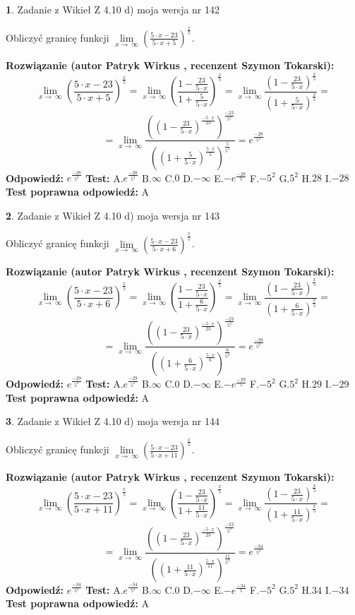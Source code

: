 \documentclass[12pt, a4paper]{article}
\theoremstyle{definition} %
\newtheorem{zad}{}
\newcommand{\zadStart}[1]{\begin{zad}#1\newline}
\newcommand{\zadStop}{\end{zad}}
\newcommand{\rozwStart}[2]{\noindent \textbf{Rozwiązanie (autor #1 , recenzent #2): }\newline}
\newcommand{\rozwStop}{\newline}
\newcommand{\odpStart}{\noindent \textbf{Odpowiedź:}\newline}
\newcommand{\odpStop}{\newline}
\newcommand{\testStart}{\noindent \textbf{Test:}\newline}
\newcommand{\testStop}{\newline}
\newcommand{\kluczStart}{\noindent \textbf{Test poprawna odpowiedź:}\newline}
\newcommand{\kluczStop}{\newline}
\begin{document}
\zadStart{Zadanie z Wikieł Z 4.10 d) moja wersja nr 142}


Obliczyć granicę funkcji  $\lim\limits_{x\to\ \infty}(\frac{5\cdot x-23}{5\cdot x+5})^{\frac{x}{5}}$.
\zadStop
\rozwStart{Patryk Wirkus}{Szymon Tokarski}
$$\lim\limits_{x\to\ \infty}(\frac{5\cdot x-23}{5\cdot x+5})^{\frac{x}{5}} = \lim\limits_{x\to\ \infty}(\frac{1-\frac{23}{5\cdot x}}{1+\frac{5}{5\cdot x}})^{\frac{x}{5}}=\lim\limits_{x\to\ \infty}\frac{(1-\frac{23}{5\cdot x})^{\frac{x}{5}}}{(1+\frac{5}{5\cdot x})^{\frac{x}{5}}}=$$
$$=\lim\limits_{x\to\ \infty}\frac{((1-\frac{23}{5\cdot x})^{\frac{-5\cdot x}{23}})^{\frac{-23}{5^{2}}}}{((1+\frac{5}{5\cdot x})^{\frac{5\cdot x}{5}})^{\frac{5}{5^{2}}}}=e^{\frac{-28}{5^{2}}}$$
\rozwStop
\odpStart
$e^{\frac{-28}{5^{2}}}$
\odpStop
\testStart
A.$e^{\frac{-28}{5^{2}}}$ B.$\infty$ C.$0$ D.$-\infty$ E.$-e^{\frac{-28}{5}}$
F.$-5^{2}$ G.$5^{2}$
H.$28$
I.$-28$
\testStop
\kluczStart
A
\kluczStop



\zadStart{Zadanie z Wikieł Z 4.10 d) moja wersja nr 143}


Obliczyć granicę funkcji  $\lim\limits_{x\to\ \infty}(\frac{5\cdot x-23}{5\cdot x+6})^{\frac{x}{5}}$.
\zadStop
\rozwStart{Patryk Wirkus}{Szymon Tokarski}
$$\lim\limits_{x\to\ \infty}(\frac{5\cdot x-23}{5\cdot x+6})^{\frac{x}{5}} = \lim\limits_{x\to\ \infty}(\frac{1-\frac{23}{5\cdot x}}{1+\frac{6}{5\cdot x}})^{\frac{x}{5}}=\lim\limits_{x\to\ \infty}\frac{(1-\frac{23}{5\cdot x})^{\frac{x}{5}}}{(1+\frac{6}{5\cdot x})^{\frac{x}{5}}}=$$
$$=\lim\limits_{x\to\ \infty}\frac{((1-\frac{23}{5\cdot x})^{\frac{-5\cdot x}{23}})^{\frac{-23}{5^{2}}}}{((1+\frac{6}{5\cdot x})^{\frac{5\cdot x}{6}})^{\frac{6}{5^{2}}}}=e^{\frac{-29}{5^{2}}}$$
\rozwStop
\odpStart
$e^{\frac{-29}{5^{2}}}$
\odpStop
\testStart
A.$e^{\frac{-29}{5^{2}}}$ B.$\infty$ C.$0$ D.$-\infty$ E.$-e^{\frac{-29}{5}}$
F.$-5^{2}$ G.$5^{2}$
H.$29$
I.$-29$
\testStop
\kluczStart
A
\kluczStop



\zadStart{Zadanie z Wikieł Z 4.10 d) moja wersja nr 144}


Obliczyć granicę funkcji  $\lim\limits_{x\to\ \infty}(\frac{5\cdot x-23}{5\cdot x+11})^{\frac{x}{5}}$.
\zadStop
\rozwStart{Patryk Wirkus}{Szymon Tokarski}
$$\lim\limits_{x\to\ \infty}(\frac{5\cdot x-23}{5\cdot x+11})^{\frac{x}{5}} = \lim\limits_{x\to\ \infty}(\frac{1-\frac{23}{5\cdot x}}{1+\frac{11}{5\cdot x}})^{\frac{x}{5}}=\lim\limits_{x\to\ \infty}\frac{(1-\frac{23}{5\cdot x})^{\frac{x}{5}}}{(1+\frac{11}{5\cdot x})^{\frac{x}{5}}}=$$
$$=\lim\limits_{x\to\ \infty}\frac{((1-\frac{23}{5\cdot x})^{\frac{-5\cdot x}{23}})^{\frac{-23}{5^{2}}}}{((1+\frac{11}{5\cdot x})^{\frac{5\cdot x}{11}})^{\frac{11}{5^{2}}}}=e^{\frac{-34}{5^{2}}}$$
\rozwStop
\odpStart
$e^{\frac{-34}{5^{2}}}$
\odpStop
\testStart
A.$e^{\frac{-34}{5^{2}}}$ B.$\infty$ C.$0$ D.$-\infty$ E.$-e^{\frac{-34}{5}}$
F.$-5^{2}$ G.$5^{2}$
H.$34$
I.$-34$
\testStop
\kluczStart
A
\kluczStop
\end{document}
